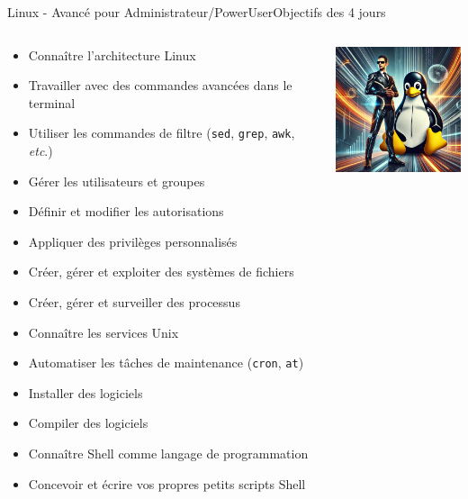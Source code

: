 \documentclass{beamer}
\begin{document}
    \begin{frame}{Linux - Avancé pour Administrateur/PowerUser}{Objectifs des 4 jours}
        \begin{columns}
            \begin{scriptsize}
                \begin{itemize}
                    \item Connaître l'architecture Linux
                    \item Travailler avec des commandes avancées dans le terminal
                    \item Utiliser les commandes de filtre (\lstinline{sed}, \lstinline{grep}, \lstinline{awk}, \textit{etc}.)
                    \item Gérer les utilisateurs et groupes
                    \item Définir et modifier les autorisations
                    \item Appliquer des privilèges personnalisés
                    \item Créer, gérer et exploiter des systèmes de fichiers
                    \item Créer, gérer et surveiller des processus
                    \item Connaître les services Unix
                    \item Automatiser les tâches de maintenance (\lstinline{cron}, \lstinline{at})
                    \item Installer des logiciels
                    \item Compiler des logiciels
                    \item Connaître Shell comme langage de programmation
                    \item Concevoir et écrire vos propres petits scripts Shell
                \end{itemize}
            \end{scriptsize}
            \includegraphics[width=4cm]{image/IT-man-and-penguin}
        \end{columns}
    \end{frame}
\end{document}
